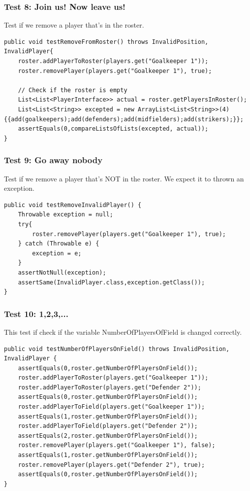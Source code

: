 \documentclass{article}
\begin{document}
\subsubsection*{Test 8: Join us! Now leave us!}
Test if we remove a player that's in the roster.
\begin{lstlisting}
public void testRemoveFromRoster() throws InvalidPosition, InvalidPlayer{
	roster.addPlayerToRoster(players.get("Goalkeeper 1"));
	roster.removePlayer(players.get("Goalkeeper 1"), true);
	
	// Check if the roster is empty
	List<List<PlayerInterface>> actual = roster.getPlayersInRoster();
	List<List<String>> excepted = new ArrayList<List<String>>(4) {{add(goalkeepers);add(defenders);add(midfielders);add(strikers);}};
	assertEquals(0,compareListsOfLists(excepted, actual));
}
\end{lstlisting}

\subsubsection*{Test 9: Go away nobody}
Test if we remove a player that's NOT in the roster. We expect it to thrown an exception.
\begin{lstlisting}
public void testRemoveInvalidPlayer() {
	Throwable exception = null;
	try{
		roster.removePlayer(players.get("Goalkeeper 1"), true);
	} catch (Throwable e) {
		exception = e;
	}
	assertNotNull(exception);
	assertSame(InvalidPlayer.class,exception.getClass());
}
\end{lstlisting}

\subsubsection*{Test 10: 1,2,3,...}
This test if check if the variable NumberOfPlayersOfField is changed correctly.
\begin{lstlisting}
public void testNumberOfPlayersOnField() throws InvalidPosition, InvalidPlayer {
	assertEquals(0,roster.getNumberOfPlayersOnField());
	roster.addPlayerToRoster(players.get("Goalkeeper 1"));
	roster.addPlayerToRoster(players.get("Defender 2"));
	assertEquals(0,roster.getNumberOfPlayersOnField());
	roster.addPlayerToField(players.get("Goalkeeper 1"));
	assertEquals(1,roster.getNumberOfPlayersOnField());
	roster.addPlayerToField(players.get("Defender 2"));
	assertEquals(2,roster.getNumberOfPlayersOnField());
	roster.removePlayer(players.get("Goalkeeper 1"), false);
	assertEquals(1,roster.getNumberOfPlayersOnField());
	roster.removePlayer(players.get("Defender 2"), true);
	assertEquals(0,roster.getNumberOfPlayersOnField());
}
\end{lstlisting}
\end{document}
